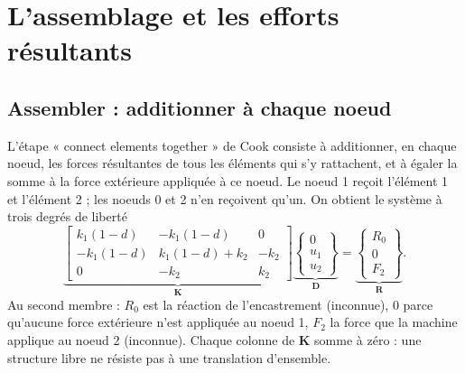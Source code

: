 \documentclass[11pt,a4paper]{article}
\newcommand{\kun}{k_1(1-d)}
\begin{document}
\section{L'assemblage et les efforts résultants}

\subsection{Assembler : additionner à chaque noeud}
L'étape « connect elements together » de Cook consiste à additionner, en chaque noeud, les
forces résultantes de tous les éléments qui s'y rattachent, et à égaler la somme à la force
extérieure appliquée à ce noeud. Le noeud 1 reçoit l'élément 1 et l'élément 2 ; les noeuds
0 et 2 n'en reçoivent qu'un. On obtient le système à trois degrés de liberté
\begin{equation}
  \underbrace{\begin{bmatrix}
    \kun & -\kun & 0\\
    -\kun & \kun + k_2 & -k_2\\
    0 & -k_2 & k_2
  \end{bmatrix}}_{\mathbf K}
  \underbrace{\begin{Bmatrix}0\\u_1\\u_2\end{Bmatrix}}_{\mathbf D}
  = \underbrace{\begin{Bmatrix}R_0\\ 0\\ F_2\end{Bmatrix}}_{\mathbf R}.
  \label{eq:assemble}
\end{equation}
Au second membre : $R_0$ est la réaction de l'encastrement (inconnue), $0$ parce qu'aucune
force extérieure n'est appliquée au noeud 1, $F_2$ la force que la machine applique au
noeud 2 (inconnue). Chaque colonne de $\mathbf K$ somme à zéro : une structure libre ne
résiste pas à une translation d'ensemble.
\end{document}
